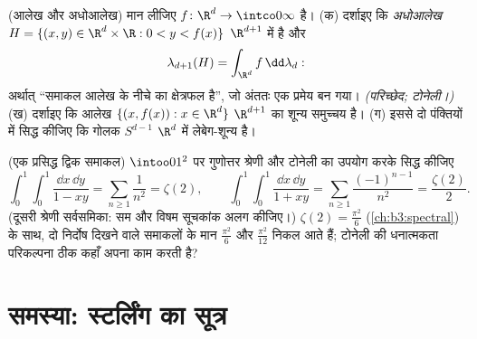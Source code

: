 \begin{exercise}[$\star\star$]\label{exo:b3:product:11}
(आलेख और अधोआलेख) मान लीजिए $f \colon \R^d \to \intco0\infty$  है।
(क) दर्शाइए कि \emph{अधोआलेख} $H = \{(x, y) \in
\R^d\times\R : 0 < y < f(x)\}$ $\R^{d+1}$ में  है और
\[
\lambda_{d+1}(H) = \int_{\R^d}f\,\dd\lambda_d :
\]
अर्थात् ``समाकल आलेख के नीचे का क्षेत्रफल है'', जो अंततः एक प्रमेय
बन गया। \emph{(परिच्छेद; टोनेली।)}
(ख) दर्शाइए कि आलेख $\{(x, f(x)) : x \in \R^d\}$ $\R^{d+1}$ का शून्य समुच्चय है।
(ग) इससे दो पंक्तियों में सिद्ध कीजिए कि गोलक $S^{d-1}$ $\R^d$ में
लेबेग-शून्य है।
\end{exercise}

\begin{exercise}[$\star\star$]\label{exo:b3:product:12}
(एक प्रसिद्ध द्विक समाकल) $\intoo01^2$ पर गुणोत्तर श्रेणी और टोनेली का
उपयोग करके सिद्ध कीजिए
\[
\int_0^1\!\!\int_0^1\frac{\dd x\,\dd y}{1 - xy}
= \sum_{n\geq1}\frac1{n^2} = \zeta(2),
\qquad
\int_0^1\!\!\int_0^1\frac{\dd x\,\dd y}{1 + xy}
= \sum_{n\geq1}\frac{(-1)^{n-1}}{n^2} = \frac{\zeta(2)}2 .
\]
(दूसरी श्रेणी सर्वसमिका: सम और विषम सूचकांक अलग कीजिए।) $\zeta(2) = \frac{\pi^2}6$
(\cref{ch:b3:spectral}) के साथ, दो निर्दोष दिखने वाले समाकलों के मान $\frac{\pi^2}6$ और
$\frac{\pi^2}{12}$ निकल आते हैं; टोनेली की धनात्मकता परिकल्पना ठीक कहाँ अपना
काम करती है?
\end{exercise}

\section{समस्या: स्टर्लिंग का सूत्र}

